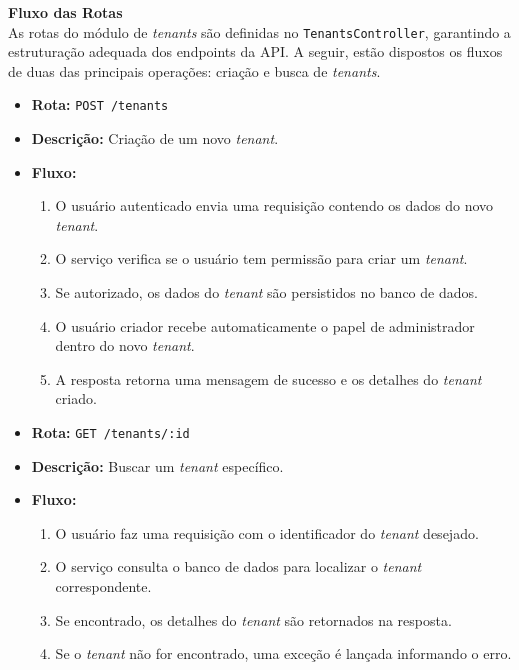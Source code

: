 \noindent\textbf{Fluxo das Rotas} \\
As rotas do módulo de \textit{tenants} são definidas no \texttt{TenantsController}, garantindo a estruturação adequada dos endpoints da API. A seguir, estão dispostos os fluxos de duas das principais operações: criação e busca de \textit{tenants}.

\begin{itemize}
	\item \textbf{Rota:} \texttt{POST /tenants}
	\item \textbf{Descrição:} Criação de um novo \textit{tenant}.
	\item \textbf{Fluxo:}
	\begin{enumerate}
    \item O usuário autenticado envia uma requisição contendo os dados do novo \textit{tenant}.
    \item O serviço verifica se o usuário tem permissão para criar um \textit{tenant}.
    \item Se autorizado, os dados do \textit{tenant} são persistidos no banco de dados.
    \item O usuário criador recebe automaticamente o papel de administrador dentro do novo \textit{tenant}.
    \item A resposta retorna uma mensagem de sucesso e os detalhes do \textit{tenant} criado.
	\end{enumerate}
\end{itemize}

\begin{itemize}
	\item \textbf{Rota:} \texttt{GET /tenants/:id}
	\item \textbf{Descrição:} Buscar um \textit{tenant} específico.
	\item \textbf{Fluxo:}
	\begin{enumerate}
    \item O usuário faz uma requisição com o identificador do \textit{tenant} desejado.
    \item O serviço consulta o banco de dados para localizar o \textit{tenant} correspondente.
    \item Se encontrado, os detalhes do \textit{tenant} são retornados na resposta.
    \item Se o \textit{tenant} não for encontrado, uma exceção é lançada informando o erro.
	\end{enumerate}
\end{itemize}

